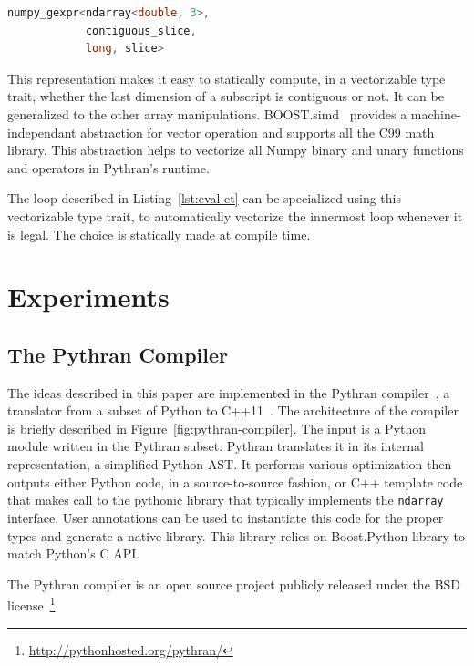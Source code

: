 \documentclass[10pt, preprint]{sigplanconf}
\begin{document}
\begin{lstlisting}[language=c++, caption={C++ type corresponding to the Numpy subscript \lstinline{a[:,0,::2]} on a 3D float matrix}, label={lst:gexpr}]
numpy_gexpr<ndarray<double, 3>,
            contiguous_slice,
            long, slice>
\end{lstlisting}

This representation makes it easy to
statically compute, in a vectorizable type trait, whether the last dimension of
a subscript is contiguous or not. It can be generalized to the other array
manipulations. BOOST.simd~\cite{esterie2012boost} provides a
machine-independant abstraction for vector operation and supports all the C99
math library. This abstraction helps to vectorize all Numpy binary and unary
functions and operators in Pythran's runtime.

The loop described in Listing~\ref{lst:eval-et} can be specialized using this
vectorizable type trait, to automatically vectorize the innermost loop whenever
it is legal. The choice is statically made at compile time.


\section{Experiments} \label{sec:xp}

\subsection{The Pythran Compiler}

The ideas described in this paper are implemented in the Pythran
compiler~\cite{pythran2013}, a translator from a subset of Python to
C++11~\cite{isocxx11}. The architecture of the compiler is briefly described
in Figure~\ref{fig:pythran-compiler}. The input is a Python module written in
the Pythran subset. Pythran translates it in its internal representation, a
simplified Python AST. It performs various optimization then outputs either
Python code, in a source-to-source fashion, or C++ template code that makes
call to the pythonic library that typically implements the \texttt{ndarray}
interface. User annotations can be used to instantiate this code for the proper
types and generate a native library. This library relies on Boost.Python
library to match Python's C API.

The Pythran compiler is an open source project publicly released under the BSD
license~\footnote{\url{http://pythonhosted.org/pythran/}}.
\end{document}
